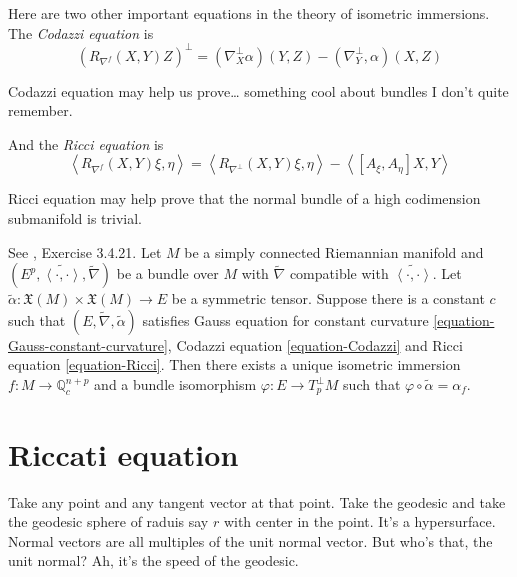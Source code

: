 \medskip\noindent

Here are two other important equations in the theory of isometric immersions. 
The {\it Codazzi equation} is
\begin{equation}
\label{equation-Codazzi}
(R_{\nabla^f}(X,Y)Z)^\perp
=(\nabla^\perp_X\alpha)(Y,Z)-(\nabla^\perp_Y,\alpha)(X,Z)
\end{equation}

Codazzi equation may help us prove… something cool about bundles I don't quite
remember.

And the {\it Ricci equation} is
\begin{equation}
\label{equation-Ricci}
\left<R_{\nabla^f}(X,Y)\xi,\eta\right>
=\left<R_{\nabla^\perp}(X,Y)\xi,\eta\right>
-\left<[A_\xi,A_\eta]X,Y\right>
\end{equation}

Ricci equation may help prove that the normal bundle of a high codimension
submanifold is trivial.

\begin{theorem}
\label{theorem-fundamental-theorem-of-submanifolds}
See \cite{pet}, Exercise 3.4.21. Let $M$ be a simply connected Riemannian 
manifold and $(E^p,\widetilde{\left<\cdot,\cdot\right>},\tilde{\nabla})$ be a 
bundle over $M$ with $\tilde{\nabla}$ compatible with 
$\widetilde{\left<\cdot,\cdot\right>}$.
Let $\tilde{\alpha}:\mathfrak{X}(M)\times \mathfrak{X}(M)\to E$ be a symmetric
tensor. Suppose there is a constant $c$ such that
$(E,\tilde{\nabla},\tilde{\alpha})$ satisfies Gauss equation for constant
curvature \ref{equation-Gauss-constant-curvature}, Codazzi equation
\ref{equation-Codazzi} and Ricci equation \ref{equation-Ricci}. 
Then there exists a unique isometric
immersion $f:M \to \mathbb{Q}_c^{n+p}$ and a bundle isomorphism $\varphi:E \to
T^\perp_pM$ such that $\varphi\circ\tilde{\alpha}=\alpha_f$.
\end{theorem}

\section{Riccati equation}
\label{section-Riccati-equation}

Take any point and any tangent vector at that point. Take the geodesic and take
the geodesic sphere of raduis say $r$ with center in the point. It's
a hypersurface. Normal vectors are all multiples of the unit normal vector. But
who's that, the unit normal? Ah, it's the speed of the geodesic.

